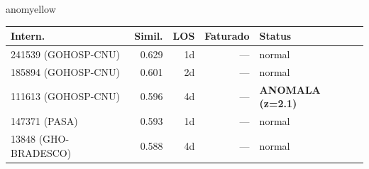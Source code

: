 \documentclass[a4paper,10pt]{article}
\begin{document}
\begin{anomalycard}[Internacao 9898 | GHO-POSTAL | MODERADO (z=2.45)]{anomyellow}
\begin{tabular}{l r r r l}\toprule\textbf{Intern.} & \textbf{Simil.} & \textbf{LOS} & \textbf{Faturado} & \textbf{Status} \\\midrule
241539 (GOHOSP-CNU) & 0.629 & 1d & --- & \textcolor{jcubeblue}{normal} \\
185894 (GOHOSP-CNU) & 0.601 & 2d & --- & \textcolor{jcubeblue}{normal} \\
111613 (GOHOSP-CNU) & 0.596 & 4d & --- & \textcolor{anomred}{\textbf{ANOMALA (z=2.1)}} \\
147371 (PASA) & 0.593 & 1d & --- & \textcolor{jcubeblue}{normal} \\
13848 (GHO-BRADESCO) & 0.588 & 4d & --- & \textcolor{jcubeblue}{normal} \\
\bottomrule\end{tabular}


\end{anomalycard}

\newpage
\end{document}
